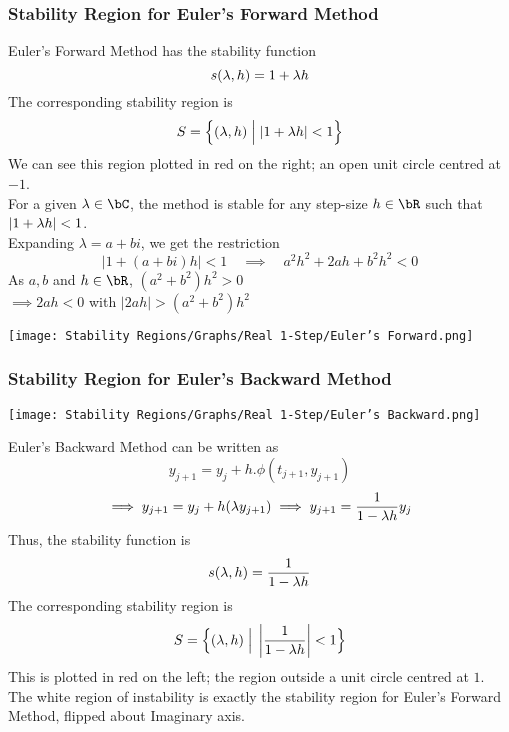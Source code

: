 \subsubsection{Stability Region for Euler's Forward Method}
\begin{multicols}{2}
\vspace*{\fill}

Euler's Forward Method has the stability function
\[s(\lambda, h) = 1 + \lambda h\]
The corresponding stability region is 
\[S = \Big\{ (\lambda, h) \;\Big|\; |1 + \lambda h| < 1\Big\}\]
We can see this region plotted in red on the right; an open unit circle centred at $-1$.\\
For a given $\lambda \in \bC$, the method is stable for any step-size $h \in \bR$ such that $|1 + \lambda h| < 1$.\\
Expanding $\lambda = a + bi$, we get the restriction
\[|1 + (a + bi)h| < 1 \quad \implies \quad a^2h^2 + 2ah + b^2h^2 < 0\]
As $a, b$ and $h \in \bR$, $(a^2 +b^2)h^2 > 0$\\
$\implies 2ah < 0$ with $|2ah| > (a^2 + b^2)h^2$

\vspace*{\fill}
\columnbreak{}
\begin{center}
\texttt{[image: Stability Regions/Graphs/Real 1-Step/Euler's Forward.png]}
\end{center}
\end{multicols}

\subsubsection{Stability Region for Euler's Backward Method}
\begin{multicols}{2}
\begin{center}
\texttt{[image: Stability Regions/Graphs/Real 1-Step/Euler's Backward.png]}
\end{center}
\columnbreak{}
\vspace*{\fill}

Euler's Backward Method can be written as
\[y_{j+1} = y_j + h.\phi(t_{j+1}, y_{j+1})\]
\[\implies y_{j+1} = y_j + h(\lambda y_{j+1}) \implies y_{j+1} = \frac{1}{1 - \lambda h}y_j\]
Thus, the stability function is
\[s(\lambda, h) = \frac{1}{1 - \lambda h}\]
The corresponding stability region is
\[S = \Big\{ (\lambda, h) \;\Big|\; \left|\frac{1}{1 - \lambda h}\right| < 1\Big\}\]
This is plotted in red on the left; the region outside a unit circle centred at $1$.\\
The white region of instability is exactly the stability region for Euler's Forward Method, flipped about Imaginary axis.\\
\vspace*{\fill}
\end{multicols}

